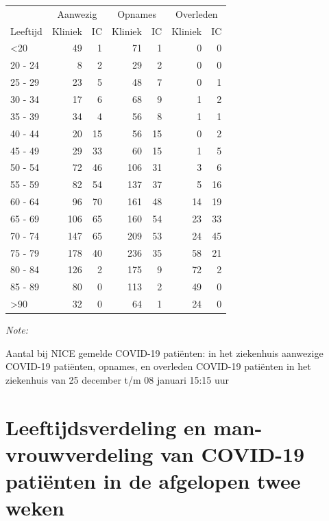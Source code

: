 \documentclass[
  english,
  man,floatsintext]{apa6}
\begin{document}
\begin{table}
\centering\begingroup\fontsize{10}{12}\selectfont

\begin{threeparttable}
\begin{tabular}{lrrrrrr}
\toprule
\multicolumn{1}{c}{ } & \multicolumn{2}{c}{Aanwezig} & \multicolumn{2}{c}{Opnames} & \multicolumn{2}{c}{Overleden} \\
\cmidrule(l{3pt}r{3pt}){2-3} \cmidrule(l{3pt}r{3pt}){4-5} \cmidrule(l{3pt}r{3pt}){6-7}
Leeftijd & Kliniek & IC & Kliniek & IC & Kliniek & IC\\
\midrule
<20 & 49 & 1 & 71 & 1 & 0 & 0\\
20 - 24 & 8 & 2 & 29 & 2 & 0 & 0\\
25 - 29 & 23 & 5 & 48 & 7 & 0 & 1\\
30 - 34 & 17 & 6 & 68 & 9 & 1 & 2\\
35 - 39 & 34 & 4 & 56 & 8 & 1 & 1\\
40 - 44 & 20 & 15 & 56 & 15 & 0 & 2\\
45 - 49 & 29 & 33 & 60 & 15 & 1 & 5\\
50 - 54 & 72 & 46 & 106 & 31 & 3 & 6\\
55 - 59 & 82 & 54 & 137 & 37 & 5 & 16\\
60 - 64 & 96 & 70 & 161 & 48 & 14 & 19\\
65 - 69 & 106 & 65 & 160 & 54 & 23 & 33\\
70 - 74 & 147 & 65 & 209 & 53 & 24 & 45\\
75 - 79 & 178 & 40 & 236 & 35 & 58 & 21\\
80 - 84 & 126 & 2 & 175 & 9 & 72 & 2\\
85 - 89 & 80 & 0 & 113 & 2 & 49 & 0\\
>90 & 32 & 0 & 64 & 1 & 24 & 0\\
\bottomrule
\end{tabular}
\begin{tablenotes}
\item \textit{Note: } 
\item Aantal bij NICE gemelde COVID-19 patiënten: in het ziekenhuis aanwezige COVID-19 patiënten, opnames, en overleden COVID-19 patiënten in het ziekenhuis van 25 december t/m 08 januari 15:15 uur
\end{tablenotes}
\end{threeparttable}
\endgroup{}
\end{table}

\newpage

\hypertarget{leeftijdsverdeling-en-man-vrouwverdeling-van-covid-19-patiuxebnten-in-de-afgelopen-twee-weken}{%
\section{Leeftijdsverdeling en man-vrouwverdeling van COVID-19 patiënten in de afgelopen twee weken}\label{leeftijdsverdeling-en-man-vrouwverdeling-van-covid-19-patiuxebnten-in-de-afgelopen-twee-weken}}
\end{document}
